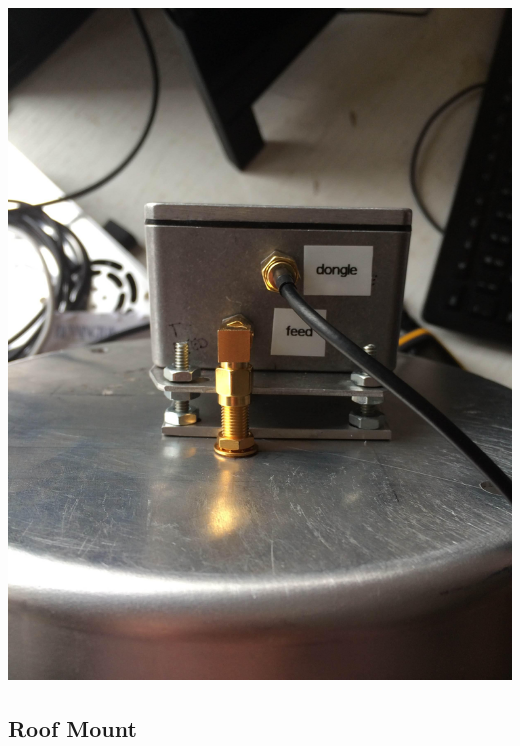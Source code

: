 \documentclass[11pt]{article} %
\begin{document}
\begin{center}
\includegraphics[scale=0.08]{feed/20.jpeg}
\end{center}






\subsection{Roof Mount}
\end{document}
